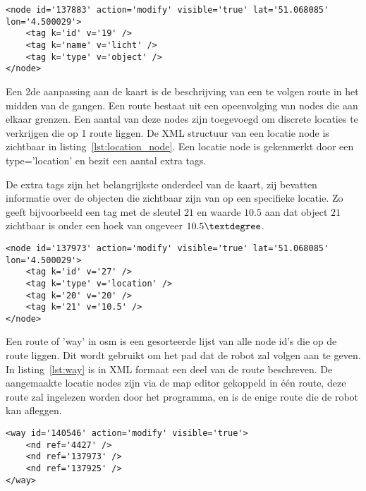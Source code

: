 \begin{lstlisting}[basicstyle=\small]
<node id='137883' action='modify' visible='true' lat='51.068085' lon='4.500029'>
    <tag k='id' v='19' />
    <tag k='name' v='licht' />
    <tag k='type' v='object' />
</node>
\end{lstlisting}

Een 2de aanpassing aan de kaart is de beschrijving van een te volgen route in het midden van de gangen.
Een route bestaat uit een opeenvolging van nodes die aan elkaar grenzen.
Een aantal van deze nodes zijn toegevoegd om discrete locaties te verkrijgen die op 1 route liggen.
De XML structuur van een locatie node is zichtbaar in listing~\ref{lst:location_node}.
Een locatie node is gekenmerkt door een type='location' en bezit een aantal extra tags.

De extra tags zijn het belangrijkste onderdeel van de kaart, zij bevatten informatie over de objecten die zichtbaar zijn van op een specifieke locatie.
Zo geeft bijvoorbeeld een tag met de sleutel $21$ en waarde $10.5$ aan dat object $21$ zichtbaar is onder een hoek van ongeveer $10.5\textdegree$.

\begin{lstlisting}[basicstyle=\small]
<node id='137973' action='modify' visible='true' lat='51.068085' lon='4.500029'>
    <tag k='id' v='27' />
    <tag k='type' v='location' />
    <tag k='20' v='20' />
    <tag k='21' v='10.5' />
</node>
\end{lstlisting}

Een route of 'way' in \gls{osm} is een gesorteerde lijst van alle node id's die op de route liggen. Dit wordt gebruikt om het pad dat de robot zal volgen aan te geven.
In listing~\ref{lst:way} is in XML formaat een deel van de route beschreven.
De aangemaakte locatie nodes zijn via de map editor gekoppeld in \'{e}\'{e}n route, deze route zal ingelezen worden door het programma, en is de enige route die de robot kan afleggen.

\begin{lstlisting}[basicstyle=\small]
<way id='140546' action='modify' visible='true'>
    <nd ref='4427' />
    <nd ref='137973' />
    <nd ref='137925' />
</way>
\end{lstlisting}

